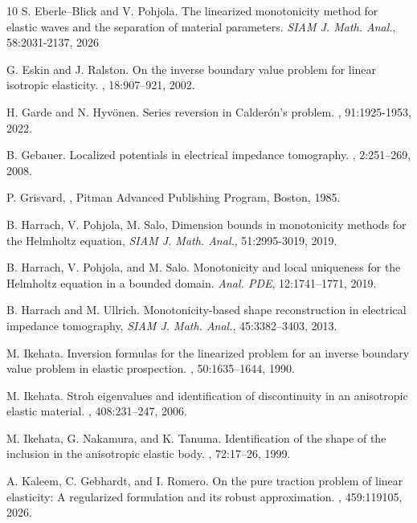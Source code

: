 \documentclass[reqno]{amsart}
\numberwithin{equation}{section}
\numberwithin{figure}{section}
\numberwithin{table}{section}
\theoremstyle{definition}
\theoremstyle{plain}
\theoremstyle{definition}
\theoremstyle{remark}
\numberwithin{equation}{section}
\begin{document}
\begin{thebibliography}{10}
S. Eberle--Blick and V. Pohjola.
\newblock The linearized monotonicity method for elastic waves and the separation of material parameters.
\newblock \textit{SIAM J. Math. Anal.}, 58:2031-2137, 2026

G. Eskin and J. Ralston.
\newblock On the inverse boundary value problem for linear isotropic elasticity.
, 18:907--921, 2002.

H. Garde and N. Hyv\"onen. 
\newblock Series reversion in Calder\'on's problem. 
, 91:1925-1953, 2022.

B. Gebauer.
\newblock Localized potentials in electrical impedance tomography.
, 2:251--269, 2008.

P. Grisvard, 
, 
\newblock Pitman Advanced Publishing Program, Boston, 1985.

B. Harrach, V. Pohjola, M. Salo,
\newblock Dimension bounds in monotonicity methods for the Helmholtz equation,
\newblock \emph{SIAM J. Math. Anal.}, 51:2995-3019, 2019. 

B. Harrach, V. Pohjola, and M. Salo.
\newblock Monotonicity and local uniqueness for the Helmholtz equation in a bounded domain.
\newblock \textit{Anal. PDE}, 12:1741--1771, 2019.  

B. Harrach and M. Ullrich.
\newblock Monotonicity-based shape reconstruction in electrical impedance tomography,
\newblock \emph{SIAM J. Math. Anal.}, 45:3382--3403, 2013.

M. Ikehata.
\newblock Inversion formulas for the linearized problem for an inverse boundary value problem in elastic prospection.
, 50:1635--1644, 1990.

M. Ikehata.
\newblock Stroh eigenvalues and identification of discontinuity in an anisotropic elastic material.
, 408:231--247, 2006.

M. Ikehata, G. Nakamura, and K. Tanuma.
\newblock Identification of the shape of the inclusion in the anisotropic elastic body.
, 72:17--26, 1999.

A. Kaleem, C. Gebhardt, and I. Romero.
\newblock  On the pure traction problem of linear elasticity:
A regularized formulation and its robust
approximation.
, 459:119105, 2026.


\end{thebibliography}
\end{document}
